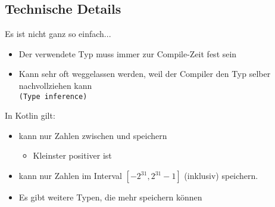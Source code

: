 \subsection{Technische Details}
\begin{frame} %
    \slidehead
    Es ist nicht ganz so einfach...

    \begin{itemize}[<+->]
        \item Der verwendete Typ muss immer zur Compile-Zeit fest sein
        \item Kann sehr oft weggelassen werden, weil der Compiler den Typ selber nachvollziehen kann\\
            \texttt{(Type inference)}
    \end{itemize}

    \pause %
    In Kotlin gilt:
    \begin{itemize}[<+->]
        \item {} kann nur Zahlen zwischen  und  speichern
            \begin{itemize}
                \item Kleinster positiver  ist 
            \end{itemize}
        \item {} kann nur Zahlen im Interval $[-2^{31}, 2^{31}-1]$ (inklusiv) speichern.
        \item Es gibt weitere Typen, die mehr speichern können
    \end{itemize}
\end{frame}




